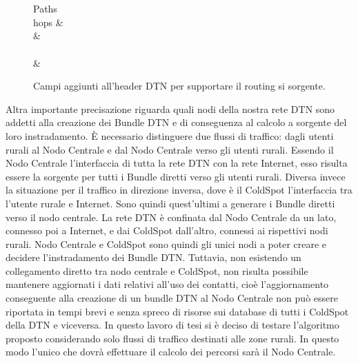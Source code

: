 \documentclass[12pt,a4paper,oneside]{book}
\begin{document}
		\vspace{25pt}
		\begin{figure}[h]
			\centering
			
			\begin{bytefield}[bitwidth=0.5em]{64}						
				 \\
				 \\
				
				\begin{rightwordgroup}{Paths \\ hops}
					 &  \\
					 &  \\
					 \\[1ex]
					 & 
				\end{rightwordgroup}			
			\end{bytefield}
			
			\caption{Campi aggiunti all'header DTN per supportare il routing si sorgente.}
			\label{routingheader}
			
		\end{figure}
		\vspace{5pt}
		
		Altra importante precisazione riguarda quali nodi della nostra rete DTN sono addetti alla creazione dei Bundle DTN e di conseguenza al calcolo a sorgente del loro instradamento. \`E necessario distinguere due flussi di traffico: dagli utenti rurali al Nodo Centrale e dal Nodo Centrale verso gli utenti rurali. Essendo il Nodo Centrale l'interfaccia di tutta la rete DTN con la rete Internet, esso risulta essere la sorgente per tutti i Bundle diretti verso gli utenti rurali. Diversa invece la situazione per il traffico in direzione inversa, dove è il ColdSpot l'interfaccia tra l'utente rurale e Internet. Sono quindi quest'ultimi a generare i Bundle diretti verso il nodo centrale. La rete DTN è confinata dal Nodo Centrale da un lato, connesso poi a Internet, e dai ColdSpot dall'altro, connessi ai rispettivi nodi rurali. Nodo Centrale e ColdSpot sono quindi gli unici nodi a poter creare e decidere l'instradamento dei Bundle DTN. Tuttavia, non esistendo un collegamento diretto tra nodo centrale e ColdSpot, non risulta possibile mantenere aggiornati i dati relativi all'uso dei contatti, cioè l'aggiornamento conseguente alla creazione di un bundle DTN al Nodo Centrale non può essere riportata in tempi brevi e senza spreco di risorse sui database di tutti i ColdSpot della DTN e viceversa. In questo lavoro di tesi si è deciso di testare l'algoritmo proposto considerando solo flussi di traffico destinati alle zone rurali. In questo modo l'unico che dovrà effettuare il calcolo dei percorsi sarà il Nodo Centrale.
		
\end{document}
